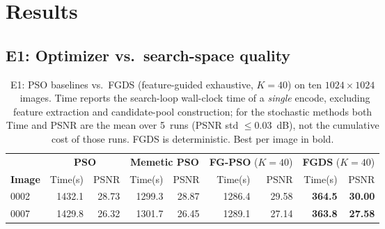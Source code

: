 \documentclass[conference, a4paper]{IEEEtran}
\begin{document}
\section{Results}

\subsection{E1: Optimizer vs.\ search-space quality}
\label{sec:exp1}

\begin{table}[t]
    \centering
    \caption{E1: PSO baselines vs.\ FGDS (feature-guided exhaustive, \mbox{$K\!=\!40$}) on ten \mbox{$1024\times1024$}~images. Time reports the search-loop wall-clock time of a \emph{single} encode, excluding feature extraction and candidate-pool construction; for the stochastic methods both Time and PSNR are the mean over 5~runs (PSNR std \mbox{$\le 0.03$}~dB), not the cumulative cost of those runs. FGDS is deterministic. Best per image in bold.}
    \label{tab:results}
    \begin{tabular}{l rrrr rrrr}
        \toprule
                       & \multicolumn{2}{c}{\textbf{PSO}} & \multicolumn{2}{c}{\textbf{Memetic PSO}} & \multicolumn{2}{c}{\textbf{FG-PSO} (\mbox{$K\!=\!40$})} & \multicolumn{2}{c}{\textbf{FGDS} (\mbox{$K\!=\!40$})}                                                     \\
        \cmidrule(lr){2-3}\cmidrule(lr){4-5}\cmidrule(lr){6-7}\cmidrule(lr){8-9}
        \textbf{Image} & Time(s)                          & PSNR                                     & Time(s)                                                 & PSNR                                                  & Time(s) & PSNR  & Time(s)        & PSNR           \\
        \midrule
        0002           & 1432.1                           & 28.73                                    & 1299.3                                                  & 28.87                                                 & 1286.4  & 29.58 & \textbf{364.5} & \textbf{30.00} \\
        0007           & 1429.8                           & 26.32                                    & 1301.7                                                  & 26.45                                                 & 1289.1  & 27.14 & \textbf{363.8} & \textbf{27.58} \\

\end{tabular}
\end{table}
\end{document}
